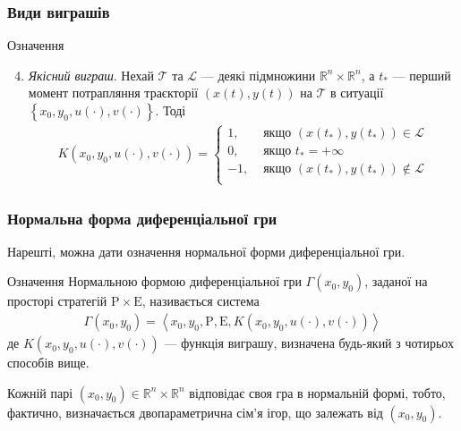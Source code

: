 \documentclass[10pt,pdf]{beamer}
\newcommand{\R}{\mathbb{R}}
\newcommand{\T}{\mathcal{T}}
\renewcommand{\l}{\left}
\renewcommand{\r}{\right}
\begin{document}
    \begin{frame}
        \frametitle{Види виграшів}
    
        \begin{block}{Означення}
            \begin{enumerate}
                \setcounter{enumi}{3}
                \item \emph{Якісний виграш}. Нехай $\T$ та $\mathcal{L}$ --- деякі підмножини $\R^n \times \R^n$, а $t_*$ --- перший момент потрапляння траєкторії $(x(t), y(t))$ на $\T$
                в ситуації $\l\{x_0, y_0, u(\cdot), v(\cdot) \r\}$. Тоді
                \begin{gather*}
                    K(x_0, y_0, u(\cdot), v(\cdot)) = \begin{cases}
                        1, & \text{ якщо } (x(t_*), y(t_*)) \in \mathcal{L} \\
                        0, & \text{ якщо } t_* = +\infty \\
                        -1, & \text{ якщо } (x(t_*), y(t_*)) \notin \mathcal{L} \\
                    \end{cases}
                \end{gather*}
            \end{enumerate}
        \end{block}
    \end{frame}
    \begin{frame}
        \frametitle{Нормальна форма диференціальної гри}
    
        Нарешті, можна дати означення нормальної форми диференціальної гри.

        \begin{block}{Означення}
            Нормальною формою диференціальної гри $\Gamma (x_0, y_0)$, заданої на просторі стратегій $\mathrm{P} \times \mathrm{E}$, називається система
            \begin{gather*}
                \Gamma (x_0, y_0) = \l<x_0, y_0, \mathrm {P}, \mathrm{E}, K(x_0, y_0, u(\cdot), v(\cdot)) \r>
            \end{gather*}
            де $K(x_0, y_0, u(\cdot), v(\cdot))$ --- функція виграшу, визначена будь-який з чотирьох способів вище.
        \end{block}

        Кожній парі $(x_0, y_0) \in \R^n \times \R^n$ відповідає своя гра в нормальній формі, тобто, фактично,
        визначається двопараметрична сім'я ігор, що залежать від $(x_0, y_0)$.
    \end{frame}
\end{document}
